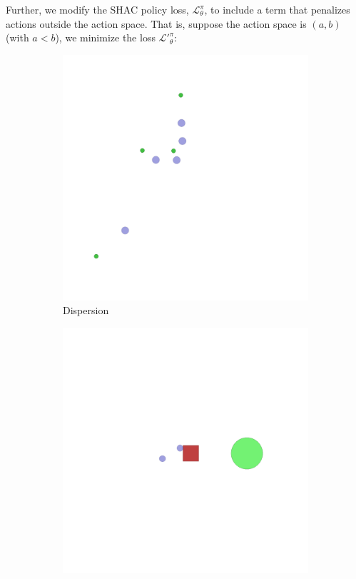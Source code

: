 Further, we modify the SHAC policy loss, $\mathcal{L}_\theta^{\pi}$, to include a term that penalizes actions outside the action space. That is, suppose the action space is $(a,b)$ (with $a<b$), we minimize the loss $\mathcal{L'}_\theta^\pi:$
\begin{figure}[!t]
    \centering
    \begin{subfigure}[b]{0.24\textwidth}
        \includegraphics[width=\textwidth]{figs/dispersion.png}
        \caption{Dispersion}
        \label{fig:dispersion}
    \end{subfigure}
    \begin{subfigure}[b]{0.24\textwidth}
        \includegraphics[width=\textwidth]{figs/transport.png}

\end{subfigure}
\end{figure}
